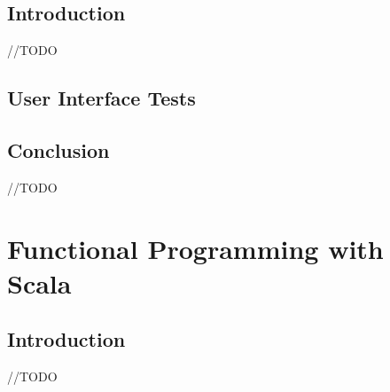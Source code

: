 \documentclass[12pt,twoside,a4paper]{report}
\begin{document}
\section{Introduction}\label{5.1}
//TODO

\section{User Interface Tests}\label{5.2}

\section{Conclusion}\label{5.10}
//TODO










\chapter{Functional Programming with Scala}\label{6}

\section{Introduction}\label{6.1}
//TODO

\end{document}
